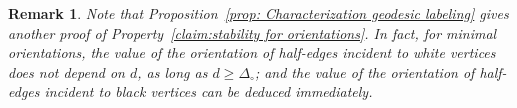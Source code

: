 \documentclass[11pt,reqno,tbtags]{amsart}
\newcommand{\rV}{\mathrm{V}}
\renewcommand{\rm}{\mathrm{m}}
\newtheorem{rema}[theo]{Remark}
\numberwithin{equation}{section}
\numberwithin{theo}{section}
\theoremstyle{definition}
\begin{document}
\begin{rema}\label{rem:proofclaim}
Note that Proposition~\ref{prop: Characterization geodesic labeling} gives another proof of Property~\ref{claim:stability for orientations}. In fact, for minimal orientations, the value of the orientation of half-edges incident to white vertices does not depend on $d$, as long as $d\geq \Delta_\circ$; and the value of the orientation of half-edges incident to black vertices can be deduced immediately.
\end{rema}


\end{document}
